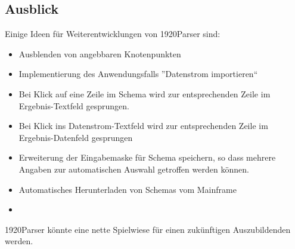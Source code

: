 \subsection{Ausblick}
\label{sec:Ausblick}
Einige Ideen für Weiterentwicklungen von 1920Parser sind:
\begin{itemize}
\item Ausblenden von angebbaren Knotenpunkten
\item Implementierung des Anwendungsfalls ''Datenstrom importieren``
\item Bei Klick auf eine Zeile im Schema wird zur entsprechenden Zeile im Ergebnis-Textfeld gesprungen.
\item Bei Klick ins Datenstrom-Textfeld wird zur entsprechenden Zeile im Ergebnis-Datenfeld gesprungen
\item Erweiterung der Eingabemaske für Schema speichern, so dass mehrere Angaben zur automatischen Auswahl getroffen werden können.
\item Automatisches Herunterladen von Schemas vom Mainframe
\item 
\end{itemize}
1920Parser könnte eine nette Spielwiese für einen zukünftigen Auszubildenden werden.






